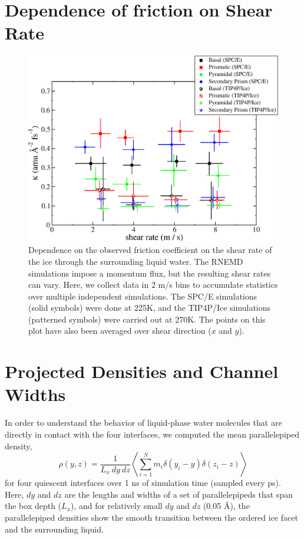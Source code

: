 \section{Dependence of friction on Shear Rate}

\begin{figure}
\includegraphics[width=\linewidth]{Figures/kappaPlot2}
\caption{\label{fig:kappaPlot} Dependence on the observed friction
  coefficient on the shear rate of the ice through the surrounding
  liquid water.  The RNEMD simulations impose a momentum flux, but the
  resulting shear rates can vary.  Here, we collect data in 2 m/s bins
  to accumulate statistics over multiple independent simulations.  The
  SPC/E simulations (solid symbols) were done at 225K, and the
  TIP4P/Ice simulations (patterned symbols) were carried out at
  270K. The points on this plot have also been averaged over shear
  direction ($x$ and $y$).}
\end{figure}

\section{Projected Densities and Channel Widths}

In order to understand the behavior of liquid-phase water molecules
that are directly in contact with the four interfaces, we computed the
mean parallelepiped density,
\begin{equation}
\rho(y, z) = \frac{1}{L_x~dy~dz} \left< \sum_{i = 1}^{N} m_i \delta(y_i - y) \delta(z_i - z)\right>
\end{equation}
for four quiescent interfaces over 1 ns of simulation time (sampled
every ps).  Here, $dy$ and $dz$ are the lengths and widths of a set of
parallelepipeds that span the box depth ($L_x$), and for relatively
small $dy$ and $dz$ (0.05 \AA), the parallelepiped densities show the
smooth transition between the ordered ice facet and the surrounding
liquid.

